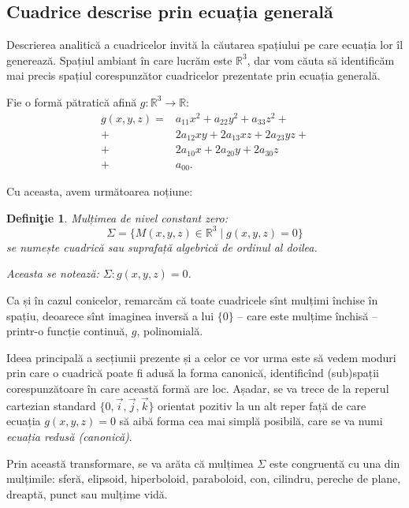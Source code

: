 \documentclass[11pt,a4paper]{article}
\theoremstyle{dotless}
\theoremstyle{dotlessdr}
\newtheorem{definition}{Defini\c{t}ie}[section]
\begin{document}

\subsection{Cuadrice descrise prin ecuația generală}

\indent\indent Descrierea analitică a cuadricelor invită la căutarea spațiului
pe care ecuația lor îl generează. Spațiul ambiant în care lucrăm este 
$\mathbb{R}^3$, dar vom căuta să identificăm mai precis spațiul corespunzător
cuadricelor prezentate prin ecuația generală.

Fie o formă pătratică afină $g : \mathbb{R}^3 \to \mathbb{R}$:
\begin{align*}
	g(x, y, z) = & a_{11}x^2 + a_{22}y^2 + a_{33}z^2 + \\
	            +& 2a_{12}xy + 2a_{13} xz + 2a_{23} yz + \\
	            +& 2a_{10}x + 2a_{20}y + 2a_{30} z \\
	            +& a_{00}.
\end{align*}

Cu aceasta, avem următoarea noțiune:
\begin{definition}
	Mulțimea de nivel constant zero: 
 \[
	\Sigma = \{ M(x, y, z) \in \mathbb{R}^3 \mid g(x, y, z) = 0\}
\]
se numește \emph{cuadrică} sau \emph{suprafață algebrică de ordinul al doilea}.

Aceasta se notează: $\Sigma: g(x, y, z) = 0$.
\end{definition}

Ca și în cazul conicelor, remarcăm că toate cuadricele sînt mulțimi închise
în spațiu, deoarece sînt imaginea inversă a lui $\{0\}$ -- care este mulțime
închisă -- printr-o funcție continuă, $g$, polinomială.

Ideea principală a secțiunii prezente și a celor ce vor urma este să vedem
moduri prin care o cuadrică poate fi adusă la forma canonică, identificînd
(sub)spații corespunzătoare în care această formă are loc. Așadar, se va trece
de la reperul cartezian standard $\{0, \vec{i}, \vec{j}, \vec{k}\}$ orientat
pozitiv la un alt reper față de care ecuația $g(x, y, z) = 0$ să aibă forma
cea mai simplă posibilă, care se va numi \emph{ecuația redusă (canonică)}.

Prin această transformare, se va arăta că mulțimea $\Sigma$ este congruentă cu
una din mulțimile: sferă, elipsoid, hiperboloid, paraboloid, con, cilindru,
pereche de plane, dreaptă, punct sau mulțime vidă.
\end{document}
